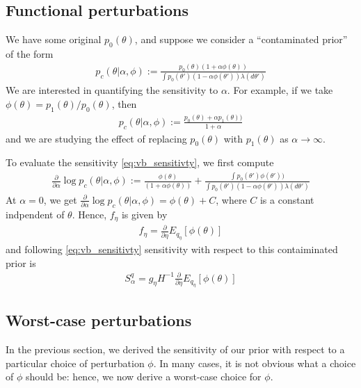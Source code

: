 \documentclass[a4paper]{article}
\begin{document}
\subsection{Functional perturbations}
\label{sec:func_pert}
We have some original $p_0(\theta)$, and suppose we consider a
``contaminated prior'' of the form
\begin{align}
	p_c(\theta | \alpha, \phi) :=  \frac{p_0(\theta)(1 + \alpha \phi(\theta))}
	{\int p_0(\theta')(1 - \alpha \phi(\theta'))\lambda(d\theta')}
\end{align}
We are interested in quantifying the sensitivity to $\alpha$. For example, if we take
$\phi(\theta) = p_1(\theta) / p_0(\theta)$, then
\begin{align}
	p_c(\theta | \alpha, \phi) :=  \frac{p_0(\theta) + \alpha p_1(\theta))}
	{1 + \alpha}
\end{align}
and we are studying the effect of replacing $p_0(\theta)$ with $p_1(\theta)$ as $\alpha \rightarrow \infty$.

To evaluate the sensitivity \ref{eq:vb_sensitivty}, we first compute
\begin{align}
	\frac{\partial}{\partial \alpha} \log p_c(\theta | \alpha, \phi) :=
		\frac{\phi(\theta)}{(1 + \alpha \phi(\theta))}
		+ \frac{\int p_0(\theta')\phi(\theta'))}{
		\int p_0(\theta')(1 - \alpha \phi(\theta'))\lambda(d\theta')
		}
\end{align}
At $\alpha = 0$, we get
$\frac{\partial}{\partial \alpha} \log p_c(\theta | \alpha, \phi)
= \phi(\theta) + C$, where $C$ is a constant indpendent of $\theta$.
Hence, $f_\eta$ is given by
\begin{align}
	f_\eta = \frac{\partial}{\partial \eta} E_{q_\eta}[\phi(\theta)]
\end{align}
and following \ref{eq:vb_sensitivty} sensitivity with respect to this contaiminated prior is
\begin{align}
	S^q_\alpha = g_\eta H^{-1}\frac{\partial}{\partial \eta} E_{q_\eta}[\phi(\theta)]
	\label{eq:func_sensitivity}
\end{align}

\subsection{Worst-case perturbations}
In the previous section, we derived the sensitivity of our prior with respect to a
particular choice of perturbation $\phi$. In many cases, it is not obvious what
a choice of $\phi$ should be: hence, we now derive a worst-case choice for $\phi$.
\end{document}
